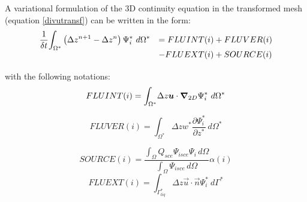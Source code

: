 %
%
A variational formulation of the 3D continuity equation in the transformed mesh
(equation \ref{divutransf}) can be written in the form:
\begin{equation}
\begin{array}{ll}
\dfrac{1}{\delta t}\displaystyle{\int_{\Omega^{\ast}}}\left(\Delta z^{n+1}-\Delta z^{n}\right)\Psi_{i}^{\ast}~d\Omega^{\ast} & =
FLUINT(i)+FLUVER(i) \\ \medskip
& -FLUEXT(i)+SOURCE(i) \label{contidistr}
\end{array}
\end{equation}
with the following notations:
\begin{equation}
FLUINT(i)=\displaystyle{\int_{\Omega^{\ast}}}\Delta z\bm{u}
\cdot\bm{\nabla}_{2D}\Psi_{i}^{\ast}~d\Omega^{\ast}
\end{equation}

\begin{equation}
FLUVER(i)=\int_{\Omega^{\ast}}\Delta zw^{\ast}\dfrac{\partial\Psi_{i}^{\ast}%
}{\partial z^{\ast}}~d\Omega^{\ast}%
\end{equation}

\begin{equation}
SOURCE(i)=\dfrac{\int\nolimits_{\Omega}Q_{sce}\Psi_{isce}\Psi_{i}\,d\Omega
}{\int\nolimits_{\Omega}\Psi_{isce}\,d\Omega}\alpha(i)
\end{equation}
%
\begin{equation}
FLUEXT(i)=\int\nolimits_{\Gamma_{liq}^{\ast}}\Delta z\vec{u}%
\cdot\vec{n}\Psi_{i}^{\ast}~d\Gamma^{\ast}%
\end{equation}

